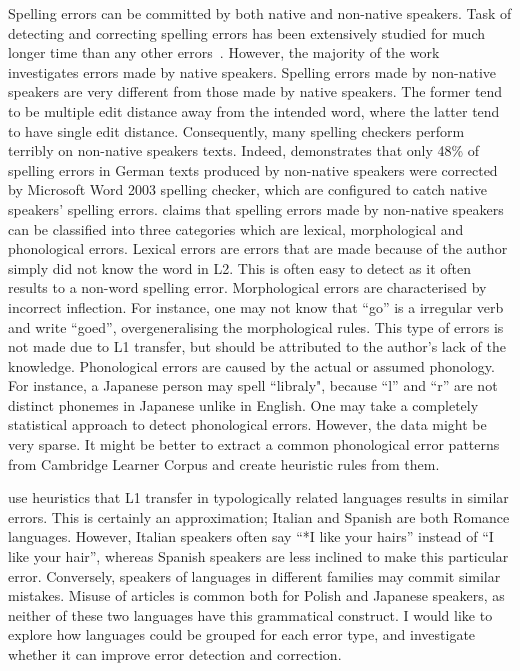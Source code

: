 \documentclass[11pt]{article}
\begin{document}
Spelling errors can be committed by both native and non-native speakers. Task of detecting and correcting spelling errors has been extensively studied for much longer time than any other errors~\citep{heift2007errors}. However, the majority of the work investigates errors made by native speakers. Spelling errors made by non-native speakers are very different from those made by native speakers. The former tend to be multiple edit distance away from the intended word, where the latter tend to have single edit distance. Consequently, many spelling checkers perform terribly on non-native speakers texts. Indeed, \cite{rimrott2005language} demonstrates that only 48\% of spelling errors in German texts produced by non-native speakers were corrected by Microsoft Word 2003 spelling checker, which are configured to catch native speakers' spelling errors.  \cite{rimrott2008evaluating} claims that spelling errors made by non-native speakers can be classified into three categories which are lexical, morphological and phonological errors. Lexical errors are errors that are made because of the author simply did not know the word in L2. This is often easy to detect as it often results to a non-word spelling error. Morphological errors are characterised by incorrect inflection. For instance, one may not know that ``go'' is a irregular verb and write ``goed'', overgeneralising the morphological rules. This type of errors is not made due to L1 transfer, but should be attributed to the author's lack of the knowledge. Phonological errors are caused by the actual or assumed phonology. For instance, a Japanese person may spell ``libraly", because ``l'' and ``r'' are not distinct phonemes in Japanese unlike in English. One may take a completely statistical approach to detect phonological errors. However, the data might be very sparse. It might be better to extract a common phonological error patterns from Cambridge Learner Corpus and create heuristic rules from them.

\cite{kochmarcross} use heuristics that L1 transfer in typologically related languages results in similar errors. This is certainly an approximation; Italian and Spanish are both Romance languages. However, Italian speakers often say ``*I like your hairs'' instead of ``I like your hair'', whereas Spanish speakers are less inclined to make this particular error. Conversely, speakers of languages in different families may commit similar mistakes. Misuse of articles is common both for Polish and Japanese speakers, as neither of these two languages have this grammatical construct. I would like to explore how languages could be grouped for each error type, and investigate whether it can improve error detection and correction.
\end{document}
